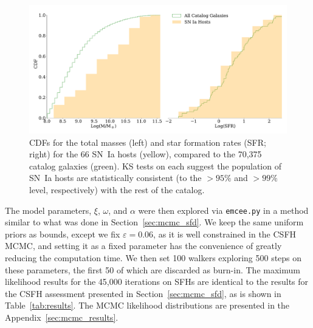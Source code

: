 \documentclass[apj]{aastex62}
\begin{document}
\begin{figure}[t] %
   \centering
   \includegraphics[width=6.1in]{figure_cdfs.pdf} 
   \caption{\footnotesize CDFs for the total masses (left) and star formation rates (SFR; right) for the 66 SN~Ia hosts (yellow), compared to the 70,375 catalog galaxies (green). KS tests on each suggest the population of SN~Ia hosts are statistically consistent (to the $>95\%$ and $>99\%$ level, respectively) with the rest of the catalog.}
   \label{fig:figure_cdfs}
\end{figure}

The model parameters, $\xi$, $\omega$, and $\alpha$ were then explored via {\tt emcee.py} in a method similar to what was done in Section~\ref{sec:mcmc_sfd}. We keep the same uniform priors as bounds, except we fix $\varepsilon=0.06$, as it is well constrained in the CSFH MCMC, and setting it as a fixed parameter has the convenience of greatly reducing the computation time. We then set 100 walkers exploring 500 steps on these parameters, the first 50 of which are discarded as burn-in. The maximum likelihood results for the 45,000 iterations on SFHs are identical to the results for the CSFH assessment presented in Section~\ref{sec:mcmc_sfd}, as is shown in Table~\ref{tab:results}. The MCMC likelihood distributions are presented in the Appendix~\ref{sec:mcmc_results}.
\end{document}
